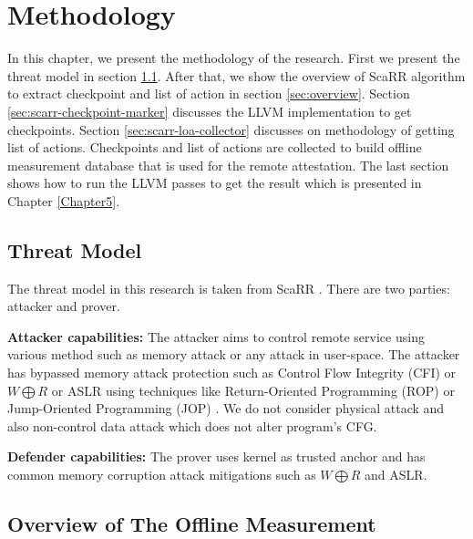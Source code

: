 
\chapter{Methodology} %

\label{Chapter4} %

In this chapter, we present the methodology of the research. First we present
the threat model in section \ref{sec:threat-model}.  After that, we show the
overview of ScaRR algorithm to extract checkpoint and list of action in section
\ref{sec:overview}. Section \ref{sec:scarr-checkpoint-marker} discusses the LLVM
implementation to get checkpoints. Section \ref{sec:scarr-loa-collector}
discusses on methodology of getting list of actions.  
Checkpoints and list of actions are collected to build offline measurement 
database that is used for the remote attestation. The last section shows how to run the LLVM passes to 
get the result which is presented in Chapter \ref{Chapter5}.

\section{Threat Model}
\label{sec:threat-model}

The threat model in this research is taken from ScaRR
\cite{toffaliniScaRRScalableRuntime2019}. There are two parties: attacker and
prover. 

\vspace{0.5cm}
\noindent \textbf{Attacker capabilities:} The attacker aims to control remote
service using various method such as memory attack or any attack in user-space.
The attacker has bypassed memory attack protection such as Control Flow
Integrity (CFI) or \( W \bigoplus R \) or ASLR using techniques like
Return-Oriented Programming
(ROP)\cite{roemerReturnorientedProgrammingSystems2012} or Jump-Oriented
Programming (JOP) \cite{bletschJumpOrientedProgrammingNew2011}. We do not
consider physical attack and also non-control data attack which does not alter
program's CFG.

\vspace{0.5cm}
\noindent \textbf{Defender capabilities:} The prover uses kernel as trusted
anchor and has common memory corruption attack mitigations such as \( W
\bigoplus R \) and ASLR.  

\section{Overview of The Offline Measurement}\
\label{sec:overview}

